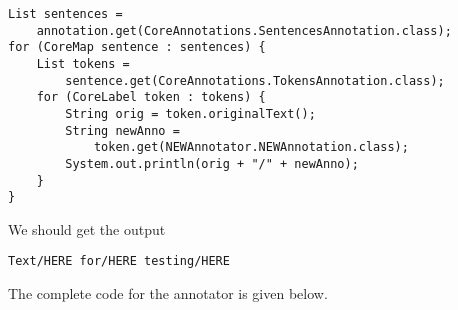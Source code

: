 \documentclass{book}
\begin{document}
\begin{lstlisting}[basicstyle=\ttfamily\small\bfseries]
List sentences = 
    annotation.get(CoreAnnotations.SentencesAnnotation.class);
for (CoreMap sentence : sentences) {
    List tokens = 
        sentence.get(CoreAnnotations.TokensAnnotation.class);
    for (CoreLabel token : tokens) {
        String orig = token.originalText();
        String newAnno = 
            token.get(NEWAnnotator.NEWAnnotation.class);
        System.out.println(orig + "/" + newAnno);
    }            
}
\end{lstlisting}

We should get the output

\begin{lstlisting}[basicstyle=\ttfamily\small\bfseries]
Text/HERE for/HERE testing/HERE
\end{lstlisting}

The complete code for the annotator is given below.
\end{document}

